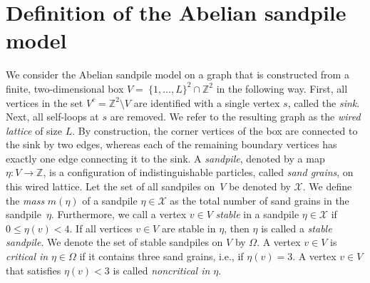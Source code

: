 \documentclass{article}
\begin{document}
\section{Definition of the Abelian sandpile model}
\label{Definition of the Abelian sandpile model}
We consider the Abelian sandpile model on a graph that is constructed from a finite, two-dimensional box $V =~\{1,\ldots, L\}^2 \cap \mathbb{Z}^2$ in the following way. First, all vertices in the set $V^c = \mathbb{Z}^2 \setminus V$ are identified with a single vertex $s$, called the \textit{sink}. Next, all self-loops at $s$ are removed. We refer to the resulting graph as the \textit{wired lattice} of size $L$. By construction, the corner vertices of the box are connected to the sink by two edges, whereas each of the remaining boundary vertices has exactly one edge connecting it to the sink. A \textit{sandpile}, denoted by a map $\eta: V \rightarrow \mathbb{Z}$, is a configuration of indistinguishable particles, called \textit{sand grains}, on this wired lattice.
Let the set of all sandpiles on~$V$ be denoted by $\mathcal{X}$. We define the \textit{mass} $m(\eta)$ of a sandpile $\eta \in \mathcal{X}$ as the total number of sand grains in the sandpile~$\eta$. Furthermore, we call a vertex $v \in V$ \textit{stable} in a sandpile $\eta \in \mathcal{X}$ if $0 \leq \eta(v) < 4$. If all vertices $v \in V$ are stable in $\eta$, then $\eta$ is called a \textit{stable sandpile}. We denote the set of stable sandpiles on $V$ by $\Omega$. A vertex $v \in V$ is \textit{critical in} $\eta \in \Omega$ if it contains three sand grains, i.e., if $\eta(v) = 3$. A vertex $v \in V$ that satisfies $\eta(v) < 3$ is called \textit{noncritical in $\eta$}.
\end{document}
